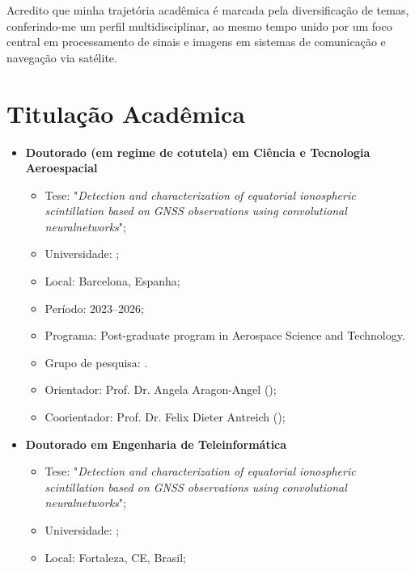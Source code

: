 \documentclass{article}
\begin{document}
Acredito que minha trajetória acadêmica é marcada pela diversificação de temas, conferindo-me um perfil multidisciplinar, ao mesmo tempo unido por um foco central em processamento de sinais e imagens em sistemas de comunicação e navegação via satélite.


\section{Titulação Acadêmica}


\begin{itemize}
  \item \textbf{Doutorado (em regime de cotutela) em Ciência e Tecnologia Aeroespacial}
  \begin{itemize}
    \item Tese: "\emph{Detection and characterization of equatorial ionospheric scintillation based on GNSS observations using convolutional neural\linebreak networks}";
    \item Universidade: ;
    \item Local:  Barcelona, Espanha;
    \item Período: 2023--2026;
    \item Programa: Post-graduate program in Aerospace Science and Technology.
    \item Grupo de pesquisa: .
    \item Orientador: Prof. Dr. Angela Aragon-Angel ();
    \item Coorientador: Prof. Dr. Felix Dieter Antreich ();
  \end{itemize}
  \item \textbf{Doutorado em Engenharia de Teleinformática}
  \begin{itemize}
    \item Tese: "\emph{Detection and characterization of equatorial ionospheric scintillation based on GNSS observations using convolutional neural\linebreak networks}";
    \item Universidade: ;
    \item Local: Fortaleza, CE, Brasil;

\end{itemize}
\end{itemize}
\end{document}
